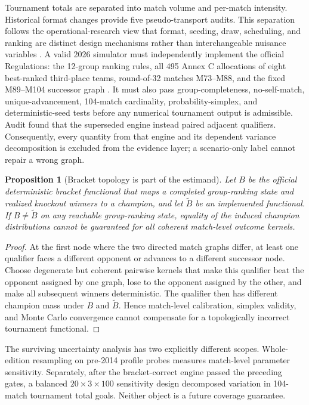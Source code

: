 \documentclass[11pt]{article}
\newtheorem{proposition}{Proposition}
\begin{document}
Tournament totals are separated into match volume and per-match intensity.  Historical format
changes provide five pseudo-transport audits.  This separation follows the operational-research
view that format, seeding, draw, scheduling, and ranking are distinct design mechanisms rather
than interchangeable nuisance variables \citep{devriesere2025}.  A valid 2026 simulator must independently implement
the official Regulations: the 12-group ranking rules, all 495 Annex C allocations of eight
best-ranked third-place teams, round-of-32 matches M73--M88, and the fixed M89--M104 successor graph
\citep{fifa2026regulations}.  It must also pass group-completeness, no-self-match, unique-advancement,
104-match cardinality, probability-simplex, and deterministic-seed tests before any numerical
tournament output is admissible.  Audit found that the superseded engine instead paired adjacent
qualifiers.  Consequently, every quantity from that engine and its dependent variance decomposition
is excluded from the evidence layer; a scenario-only label cannot repair a wrong graph.

\begin{proposition}[Bracket topology is part of the estimand]
Let $B$ be the official deterministic bracket functional that maps a completed group-ranking state
and realized knockout winners to a champion, and let $\widetilde B$ be an implemented functional.
If $B\neq\widetilde B$ on any reachable group-ranking state, equality of the induced champion
distributions cannot be guaranteed for all coherent match-level outcome kernels.
\end{proposition}

\begin{proof}
At the first node where the two directed match graphs differ, at least one qualifier faces a
different opponent or advances to a different successor node.  Choose degenerate but coherent
pairwise kernels that make this qualifier beat the opponent assigned by one graph, lose to the
opponent assigned by the other, and make all subsequent winners deterministic.  The qualifier then
has different champion mass under $B$ and $\widetilde B$.  Hence match-level calibration, simplex
validity, and Monte Carlo convergence cannot compensate for a topologically incorrect tournament
functional.
\end{proof}

The surviving uncertainty analysis has two explicitly different scopes.  Whole-edition resampling
on pre-2014 profile probes measures match-level parameter sensitivity.  Separately, after the
bracket-correct engine passed the preceding gates, a balanced $20\times3\times100$ sensitivity
design decomposed variation in 104-match tournament total goals.  Neither object is a future
coverage guarantee.
\end{document}
